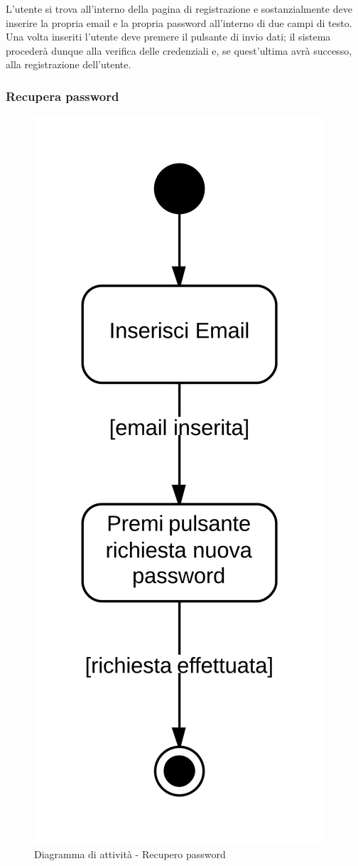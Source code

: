 L'utente si trova all'interno della pagina di registrazione e sostanzialmente deve inserire la propria email e la propria password all'interno di due campi di testo. Una volta inseriti l'utente deve premere il pulsante di invio dati; il sistema  procederà dunque alla verifica delle credenziali e, se quest'ultima avrà successo, alla registrazione dell'utente.

\subsubsection{Recupera password}

\begin{figure}[H]
\centering
\includegraphics[scale=0.05]{uml/MaaP - Recupera password.png}
\caption{Diagramma di attività - Recupero password}
\end{figure}

